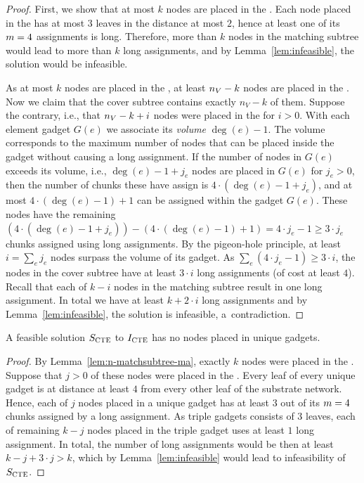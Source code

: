 \begin{proof}
  First, we show that at most $k$ nodes are placed in the \MatchSubtree.
  Each node placed in the \MatchSubtree{} has at most $3$ leaves in the distance at most $2$, hence at least one of its $m=4$ assignments is long.
  Therefore, more than $k$ nodes in the matching subtree would lead to more than $k$ long assignments, and by Lemma~\ref{lem:infeasible}, the solution would be infeasible.
  
  As at most $k$ nodes are placed in the \MatchSubtree{}, at least $n_V-k$ nodes are placed in the \CoverSubtree.
  Now we claim that the cover subtree contains exactly $n_V-k$ of them.
  Suppose the contrary, i.e., that $n_V-k+i$ nodes were placed in the \CoverSubtree{} for $i > 0$.
  With each element gadget $G(e)$ we associate its \emph{volume} $\deg(e) - 1$.
  The volume corresponds to the maximum number of nodes that can be placed inside the gadget without causing a long assignment.
  If the number of nodes in $G(e)$ exceeds its volume, i.e., $\deg(e) - 1 + j_e$ nodes are placed in $G(e)$ for $j_e > 0$,
  then the number of chunks these have assign is $4\cdot (\deg(e) - 1 + j_e)$, and at most $4\cdot (\deg(e) - 1) + 1$ can be assigned within the gadget $G(e)$.
  These nodes have the remaining $(4\cdot (\deg(e) - 1 + j_e)) - (4\cdot (\deg(e) - 1) + 1) = 4\cdot j_e - 1 \geq 3\cdot j_e$ chunks assigned using long assignments.
  By the pigeon-hole principle, at least $i = \sum_e j_e$ nodes surpass the volume of its gadget.
  As $\sum_e (4\cdot j_e - 1) \geq 3 \cdot i$, the nodes in the cover subtree have at least $3\cdot i$ long assignments (of cost at least $4$).
  Recall that each of $k-i$ nodes in the matching subtree result in one long assignment.
  In total we have at least $k+2\cdot i$ long assignments and by Lemma~\ref{lem:infeasible}, the solution is infeasible, a~contradiction.
\end{proof}

\begin{lemma}
  A feasible solution $S_{\mathrm{\textsc{CTE}}}$ to $I_{\mathrm{\textsc{CTE}}}$ has no nodes placed in unique gadgets.
  \label{lem:no-unq-ma}
\end{lemma}
\begin{proof}
  By Lemma~\ref{lem:n-matchsubtree-ma}, exactly $k$ nodes were placed in the \MatchSubtree{}.
  Suppose that $j>0$ of these nodes were placed in the \UnqGadgets{}.
  Every leaf of every unique gadget is at distance at least $4$ from every other leaf of the substrate network.
  Hence, each of $j$ nodes placed in a unique gadget has at least $3$ out of its $m = 4$ chunks assigned by a long assignment.
  As triple gadgets consists of $3$ leaves, each of remaining $k-j$ nodes placed in the triple gadget uses at least $1$ long assignment.
  In total, the number of long assignments would be then at least $k-j + 3\cdot j > k$, which by Lemma~\ref{lem:infeasible} would lead to infeasibility of $S_{\mathrm{\textsc{CTE}}}$.
\end{proof}

